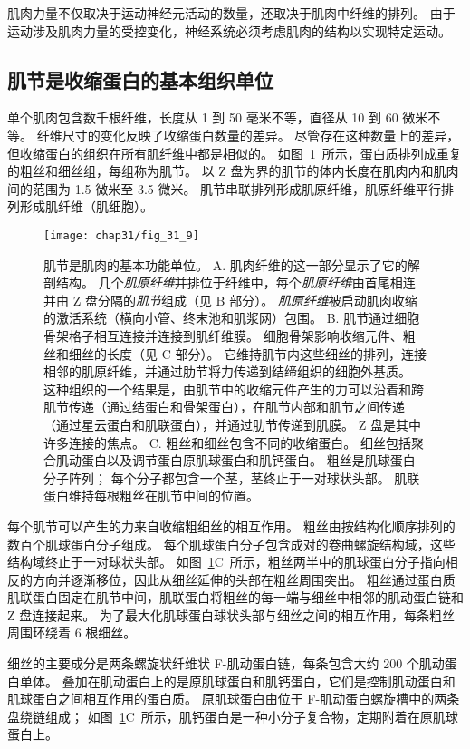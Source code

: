 肌肉力量不仅取决于运动神经元活动的数量，还取决于肌肉中纤维的排列。
由于运动涉及肌肉力量的受控变化，神经系统必须考虑肌肉的结构以实现特定运动。



\subsection{肌节是收缩蛋白的基本组织单位}

单个肌肉包含数千根纤维，长度从 1 到 50 毫米不等，直径从 10 到 60 微米不等。
纤维尺寸的变化反映了收缩蛋白数量的差异。
尽管存在这种数量上的差异，但收缩蛋白的组织在所有肌纤维中都是相似的。 
如图~\ref{fig:31_9}~所示，蛋白质排列成重复的粗丝和细丝组，每组称为肌节。
以 Z 盘为界的肌节的体内长度在肌肉内和肌肉间的范围为 1.5 微米至 3.5 微米。
肌节串联排列形成肌原纤维，肌原纤维平行排列形成肌纤维（肌细胞）。



\begin{figure}[htbp]
	\centering
	\texttt{[image: chap31/fig\_31\_9]}
	\caption{肌节是肌肉的基本功能单位\cite{bloom1952textbook}。
	A. 肌肉纤维的这一部分显示了它的解剖结构。
	几个\textit{肌原纤维}并排位于纤维中，每个\textit{肌原纤维}由首尾相连并由 Z 盘分隔的\textit{肌节}组成（见 B 部分）。
	\textit{肌原纤维}被启动肌肉收缩的激活系统（横向小管、终末池和肌浆网）包围。
	B. 肌节通过细胞骨架格子相互连接并连接到肌纤维膜。
	细胞骨架影响收缩元件、粗丝和细丝的长度（见 C 部分）。
	它维持肌节内这些细丝的排列，连接相邻的肌原纤维，并通过肋节将力传递到结缔组织的细胞外基质。
	这种组织的一个结果是，由肌节中的收缩元件产生的力可以沿着和跨肌节传递（通过结蛋白和骨架蛋白），在肌节内部和肌节之间传递（通过星云蛋白和肌联蛋白），并通过肋节传递到肌膜。
	Z 盘是其中许多连接的焦点。
	C. 粗丝和细丝包含不同的收缩蛋白。
	细丝包括聚合肌动蛋白以及调节蛋白原肌球蛋白和肌钙蛋白。
	粗丝是肌球蛋白分子阵列；
	每个分子都包含一个茎，茎终止于一对球状头部。
	肌联蛋白维持每根粗丝在肌节中间的位置。}
	\label{fig:31_9}
\end{figure}


每个肌节可以产生的力来自收缩粗细丝的相互作用。
粗丝由按结构化顺序排列的数百个肌球蛋白分子组成。
每个肌球蛋白分子包含成对的卷曲螺旋结构域，这些结构域终止于一对球状头部。
如图~\ref{fig:31_9}C~所示，粗丝两半中的肌球蛋白分子指向相反的方向并逐渐移位，因此从细丝延伸的头部在粗丝周围突出。
粗丝通过蛋白质肌联蛋白固定在肌节中间，肌联蛋白将粗丝的每一端与细丝中相邻的肌动蛋白链和 Z 盘连接起来。
为了最大化肌球蛋白球状头部与细丝之间的相互作用，每条粗丝周围环绕着 6 根细丝。


细丝的主要成分是两条螺旋状纤维状 F-肌动蛋白链，每条包含大约 200 个肌动蛋白单体。
叠加在肌动蛋白上的是原肌球蛋白和肌钙蛋白，它们是控制肌动蛋白和肌球蛋白之间相互作用的蛋白质。
原肌球蛋白由位于 F-肌动蛋白螺旋槽中的两条盘绕链组成；
如图~\ref{fig:31_9}C~所示，肌钙蛋白是一种小分子复合物，定期附着在原肌球蛋白上。


